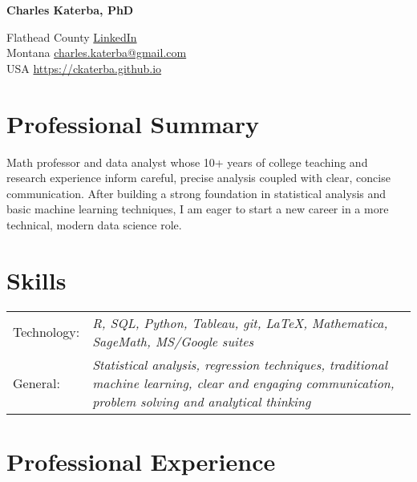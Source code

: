\documentclass[12pt]{article}
\begin{document}
\begin{center}
     \Huge{\textbf{Charles Katerba, PhD}}
\end{center}
Flathead County \hfill \href{https://www.linkedin.com/in/charles-katerba-b21b50219/}{LinkedIn}\\
Montana \hfill \href{mailto:charles.katerba@gmail.com}{charles.katerba@gmail.com} \\ 
USA  \hfill \url{https://ckaterba.github.io}

\section{Professional Summary}

Math professor and data analyst whose 10+ years of college teaching and research experience inform careful, precise analysis coupled with clear, concise communication.  After building a strong foundation in statistical analysis and basic machine learning techniques, I am eager to start a new career in a more technical, modern data science role. 

\section{Skills}

\begin{tabular}{  l p{15in} }

Technology: & \textit{R, SQL, Python, Tableau, git, \LaTeX, Mathematica, SageMath, MS/Google suites}  \\

General: & \textit{Statistical analysis, regression techniques, traditional machine learning, clear and 
\newline engaging communication, problem solving and analytical thinking} 
\end{tabular}

\section{Professional Experience}
\end{document}
